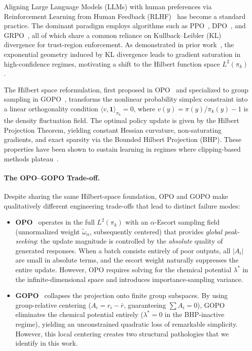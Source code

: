 \documentclass[11pt]{article}
\theoremstyle{definition}
\theoremstyle{remark}
\newcommand{\pik}{\pi_k}
\begin{document}
Aligning Large Language Models (LLMs) with human preferences via Reinforcement Learning from Human Feedback (RLHF)~\cite{Christiano2017RLHF,Ouyang2022InstructGPT} has become a standard practice. The dominant paradigm employs algorithms such as PPO~\cite{Schulman2017PPO}, DPO~\cite{Rafailov2023DPO}, and GRPO~\cite{Shao2024GRPO}, all of which share a common reliance on Kullback--Leibler (KL) divergence for trust-region enforcement. As demonstrated in prior work~\cite{Wang2025OPO,Wang2025GOPO}, the exponential geometry induced by KL divergence leads to gradient saturation in high-confidence regimes, motivating a shift to the Hilbert function space $L^2(\pik)$.

The Hilbert space reformulation, first proposed in OPO~\cite{Wang2025OPO} and specialized to group sampling in GOPO~\cite{Wang2025GOPO}, transforms the nonlinear probability simplex constraint into a linear orthogonality condition $\langle v, \mathbf{1}\rangle_{\pik} = 0$, where $v(y) = \pi(y)/\pik(y) - 1$ is the density fluctuation field. The optimal policy update is given by the Hilbert Projection Theorem, yielding constant Hessian curvature, non-saturating gradients, and exact sparsity via the Bounded Hilbert Projection (BHP). These properties have been shown to sustain learning in regimes where clipping-based methods plateau~\cite{Wang2025GOPO}.

\paragraph{The OPO--GOPO Trade-off.}
Despite sharing the same Hilbert-space foundation, OPO and GOPO make qualitatively different engineering trade-offs that lead to distinct failure modes:

\begin{itemize}[leftmargin=2em]
    \item \textbf{OPO}~\cite{Wang2025OPO} operates in the full $L^2(\pik)$ with an $\alpha$-Escort sampling field (unnormalized weight $\tilde{\omega}_\alpha$, subsequently centered) that provides \emph{global peak-seeking}: the update magnitude is controlled by the \emph{absolute} quality of generated responses. When a batch consists entirely of poor outputs, all $|A_i|$ are small in absolute terms, and the escort weight naturally suppresses the entire update. However, OPO requires solving for the chemical potential $\lambda^*$ in the infinite-dimensional space and introduces importance-sampling variance.
    
    \item \textbf{GOPO}~\cite{Wang2025GOPO} collapses the projection onto finite group subspaces. By using group-relative centering ($A_i = r_i - \bar{r}$, guaranteeing $\sum A_i = 0$), GOPO eliminates the chemical potential entirely ($\lambda^* = 0$ in the BHP-inactive regime), yielding an unconstrained quadratic loss of remarkable simplicity. However, this local centering creates two structural pathologies that we identify in this work.
\end{itemize}
\end{document}
